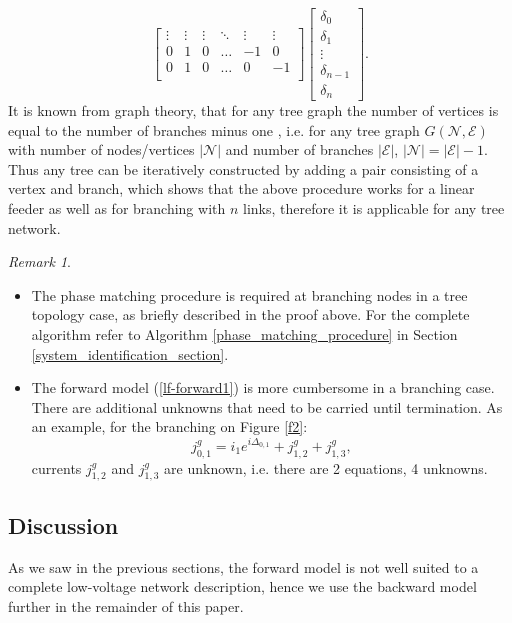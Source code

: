 \documentclass[journal,10pt,onecolumn,draftclsnofoot,]{IEEEtran}
\makeatletter
\theoremstyle{plain}
\theoremstyle{definition}
\theoremstyle{remark}
\newtheorem*{remark}{Remark}
\renewenvironment{proof}[1][\proofname]{\par
  \pushQED{\qed}%
  \normalfont \topsep6\p@\@plus6\p@\relax
  \list{}{%
    \settowidth{\leftmargin}{\itshape\proofname:\hskip\labelsep}%
    \setlength{\labelwidth}{0pt}%
    \setlength{\itemindent}{-\leftmargin}%
  }%
  \item[\hskip\labelsep\itshape#1\@addpunct{:}]\ignorespaces
}{%
  \popQED\endlist\@endpefalse
}
\makeatother
\begin{document}
\begin{proof}[Proof (Outline)]
\begin{equation*}
\begin{bmatrix}
  \vdots & \vdots & \vdots & \ddots & \vdots & \vdots \\
  0 & 1 & 0 & \ldots & -1 & 0 \\
  0 & 1 & 0 & \ldots & 0 & -1 \\
  \end{bmatrix}
  \begin{bmatrix}
  \delta_{0} \\
  \delta_{1} \\
  \vdots \\
  \delta_{n-1} \\
  \delta_{n}
  \end{bmatrix}.
  \end{equation*}
  It is known from graph theory, that for any tree graph the number of vertices is equal to the number of branches minus one \cite[Corollary $1.5.3$]{diestel2005graph}, i.e. for any tree graph $G(\mathcal{N}, \mathcal{E})$ with number of nodes/vertices $|\mathcal{N}|$ and 
  number of branches $|\mathcal{E}|$, $|\mathcal{N}| = |\mathcal{E}| - 1.$
  Thus any tree can be iteratively constructed by adding a pair consisting of a vertex and branch, which shows that the above procedure works for a linear feeder as well as for branching with $n$ links, therefore it is applicable for any tree network. 
\end{proof}
\begin{remark} \hfill
\begin{itemize}
  \item The phase matching procedure is required at branching nodes in a tree topology case, as briefly described in the proof above. For the complete algorithm refer to Algorithm \ref{phase_matching_procedure} in Section \ref{system_identification_section}.
  \item The forward model (\ref{lf-forward1}) is more cumbersome in a branching case. There are additional unknowns that need to be carried until termination. As an example, for the branching on Figure \ref{f2}:
  $$j^g_{0,1} = i_{1}e^{i\Delta_{0, 1}} + j_{1,2}^g + j_{1,3}^g,$$
  currents $j_{1,2}^g$ and $j_{1,3}^g$ are unknown, i.e. there are 2 equations, 4 unknowns.
\end{itemize}
\end{remark}

\subsection{Discussion}

As we saw in the previous sections, the forward model is not well suited to a complete low-voltage network description, hence we use the backward model further in the remainder of this paper. 
\end{document}
